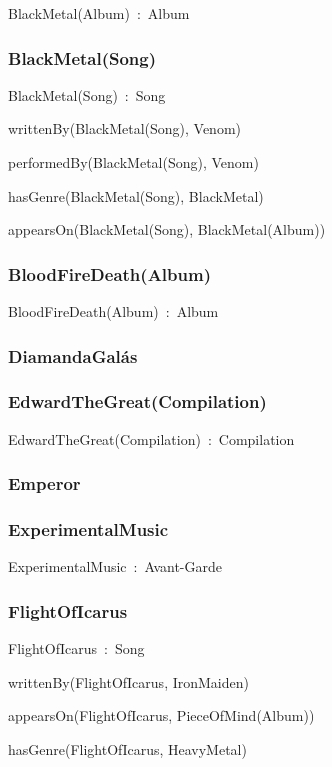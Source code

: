 \documentclass{article}
\begin{document}
BlackMetal(Album)~:~Album

\subsubsection*{BlackMetal(Song)}

BlackMetal(Song)~:~Song

writtenBy(BlackMetal(Song), Venom)

performedBy(BlackMetal(Song), Venom)

hasGenre(BlackMetal(Song), BlackMetal)

appearsOn(BlackMetal(Song), BlackMetal(Album))

\subsubsection*{BloodFireDeath(Album)}

BloodFireDeath(Album)~:~Album

\subsubsection*{DiamandaGalás}

\subsubsection*{EdwardTheGreat(Compilation)}

EdwardTheGreat(Compilation)~:~Compilation

\subsubsection*{Emperor}

\subsubsection*{ExperimentalMusic}

ExperimentalMusic~:~Avant-Garde

\subsubsection*{FlightOfIcarus}

FlightOfIcarus~:~Song

writtenBy(FlightOfIcarus, IronMaiden)

appearsOn(FlightOfIcarus, PieceOfMind(Album))

hasGenre(FlightOfIcarus, HeavyMetal)
\end{document}
